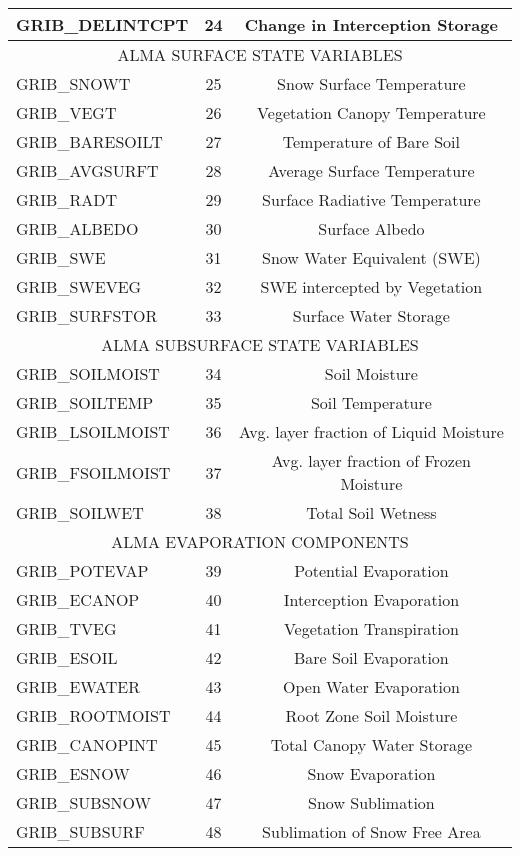 \begin{longtable}{|l|c|c|}
  GRIB\_DELINTCPT  & 24 & Change in Interception Storage \\
  \hline
  \multicolumn{3}{|c|}{ALMA SURFACE STATE VARIABLES} \\
  \hline
  GRIB\_SNOWT      & 25 & Snow Surface Temperature \\
  GRIB\_VEGT       & 26 & Vegetation Canopy Temperature \\
  GRIB\_BARESOILT  & 27 & Temperature of Bare Soil \\
  GRIB\_AVGSURFT   & 28 & Average Surface Temperature \\
  GRIB\_RADT       & 29 & Surface Radiative Temperature \\
  GRIB\_ALBEDO     & 30 & Surface Albedo \\
  GRIB\_SWE        & 31 & Snow Water Equivalent (SWE) \\
  GRIB\_SWEVEG     & 32 & SWE intercepted by Vegetation \\ 
  GRIB\_SURFSTOR   & 33 & Surface Water Storage \\
  \hline  
  \multicolumn{3}{|c|}{ALMA SUBSURFACE STATE VARIABLES} \\
  \hline
  GRIB\_SOILMOIST  & 34 & Soil Moisture \\
  GRIB\_SOILTEMP   & 35 & Soil Temperature \\ 
  GRIB\_LSOILMOIST & 36 & Avg. layer fraction of Liquid Moisture\\
  GRIB\_FSOILMOIST & 37 & Avg. layer fraction of Frozen Moisture\\
  GRIB\_SOILWET    & 38 & Total Soil Wetness \\
  \hline
  \multicolumn{3}{|c|}{ALMA EVAPORATION COMPONENTS} \\
  \hline
  GRIB\_POTEVAP    & 39 & Potential Evaporation \\
  GRIB\_ECANOP     & 40 & Interception Evaporation \\
  GRIB\_TVEG       & 41 & Vegetation Transpiration \\
  GRIB\_ESOIL      & 42 & Bare Soil Evaporation \\
  GRIB\_EWATER     & 43 & Open Water Evaporation \\ 
  GRIB\_ROOTMOIST  & 44 & Root Zone Soil Moisture \\
  GRIB\_CANOPINT   & 45 & Total Canopy Water Storage \\
  GRIB\_ESNOW      & 46 & Snow Evaporation \\
  GRIB\_SUBSNOW    & 47 & Snow Sublimation \\
  GRIB\_SUBSURF    & 48 & Sublimation of Snow Free Area\\

\end{longtable}
